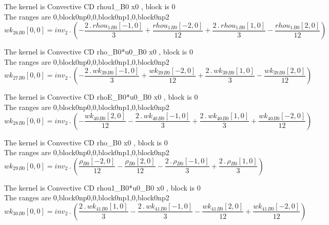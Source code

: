 \documentclass{article}
\begin{document}
\noindent The kernel is Convective CD rhou1_B0 x0 , block is 0\\\noindent The ranges are 0,block0np0,0,block0np1,0,block0np2\\\begin{dmath}{wk_{26}{_{B0}}}[{0,0}] = inv_2 \,.\, \left(- \frac{2 \,.\, {rhou_{1}{_{B0}}}[{-1,0}]}{3} + \frac{{rhou_{1}{_{B0}}}[{-2,0}]}{12} + \frac{2 \,.\, {rhou_{1}{_{B0}}}[{1,0}]}{3} - \frac{{rhou_{1}{_{B0}}}[{2,0}]}{12}\right)\end{dmath}

\noindent The kernel is Convective CD rho_B0*u0_B0 x0 , block is 0\\\noindent The ranges are 0,block0np0,0,block0np1,0,block0np2\\\begin{dmath}{wk_{27}{_{B0}}}[{0,0}] = inv_2 \,.\, \left(- \frac{2 \,.\, {wk_{39}{_{B0}}}[{-1,0}]}{3} + \frac{{wk_{39}{_{B0}}}[{-2,0}]}{12} + \frac{2 \,.\, {wk_{39}{_{B0}}}[{1,0}]}{3} - \frac{{wk_{39}{_{B0}}}[{2,0}]}{12}\right)\end{dmath}

\noindent The kernel is Convective CD rhoE_B0*u0_B0 x0 , block is 0\\\noindent The ranges are 0,block0np0,0,block0np1,0,block0np2\\\begin{dmath}{wk_{28}{_{B0}}}[{0,0}] = inv_2 \,.\, \left(- \frac{{wk_{40}{_{B0}}}[{2,0}]}{12} - \frac{2 \,.\, {wk_{40}{_{B0}}}[{-1,0}]}{3} + \frac{2 \,.\, {wk_{40}{_{B0}}}[{1,0}]}{3} + \frac{{wk_{40}{_{B0}}}[{-2,0}]}{12}\right)\end{dmath}

\noindent The kernel is Convective CD rho_B0 x0 , block is 0\\\noindent The ranges are 0,block0np0,0,block0np1,0,block0np2\\\begin{dmath}{wk_{29}{_{B0}}}[{0,0}] = inv_2 \,.\, \left(\frac{{\rho{_{B0}}}[{-2,0}]}{12} - \frac{{\rho{_{B0}}}[{2,0}]}{12} - \frac{2 \,.\, {\rho{_{B0}}}[{-1,0}]}{3} + \frac{2 \,.\, {\rho{_{B0}}}[{1,0}]}{3}\right)\end{dmath}

\noindent The kernel is Convective CD rhou1_B0*u0_B0 x0 , block is 0\\\noindent The ranges are 0,block0np0,0,block0np1,0,block0np2\\\begin{dmath}{wk_{30}{_{B0}}}[{0,0}] = inv_2 \,.\, \left(\frac{2 \,.\, {wk_{41}{_{B0}}}[{1,0}]}{3} - \frac{2 \,.\, {wk_{41}{_{B0}}}[{-1,0}]}{3} - \frac{{wk_{41}{_{B0}}}[{2,0}]}{12} + \frac{{wk_{41}{_{B0}}}[{-2,0}]}{12}\right)\end{dmath}
\end{document}
